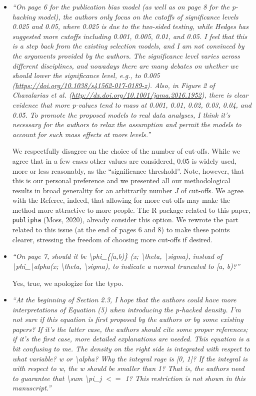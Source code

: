 \documentclass[11pt]{article}
\begin{document}
\begin{itemize}
\item \emph{``On page 6 for the publication bias model (as well as on page 8 for the p-hacking model), the authors only focus on the cutoffs of significance levels 0.025 and 0.05, where 0.025 is due to the two-sided testing, while Hedges has suggested more cutoffs including 0.001, 0.005, 0.01, and 0.05. I feel that this is a step back from the existing selection models, and I am not convinced by the arguments provided by the authors. The significance level varies across different disciplines, and nowadays there are many debates on whether we should lower the significance level, e.g., to 0.005 (\url{https://doi.org/10.1038/s41562-017-0189-z}). Also, in Figure 2 of Chavalarias et al. (\url{http://dx.doi.org/10.1001/jama.2016.1952}), there is clear evidence that more p-values tend to mass at 0.001, 0.01, 0.02, 0.03, 0.04, and 0.05. To promote the proposed models to real data analyses, I think it's necessary for the authors to relax the assumption and permit the models to account for such mass effects at more levels.''}


We respectfully disagree on the choice of the number of cut-offs. While we agree that in a few cases other values are considered, $0.05$ is widely used, more or less reasonably, as the ``significance threshold''. Note, however, that this is our personal preference and we presented all our methodological results in broad generality for an arbitrarily number $J$ of cut-offs. We agree with the Referee, indeed, that allowing for more cut-offs may make the method more attractive to more people. The R package related to this paper, \texttt{publipha} (Moss, 2020), already consider this option. We rewrote the part related to this issue (at the end of pages 6 and 8) to make these points clearer, stressing the freedom of choosing more cut-offs if desired.



\item \emph{``On page 7, should it be \textbackslash phi\_\{[a,b)\} (x; \textbackslash theta, \textbackslash sigma), instead of \textbackslash phi\_\textbackslash alpha(x; \textbackslash theta, \textbackslash sigma), to indicate a normal truncated to [a, b)?''}


Yes, true, we apologize for the typo.



\item \emph{``At the beginning of Section 2.3, I hope that the authors could have more interpretations of Equation (5) when introducing the p-hacked density. I'm not sure if this equation is first proposed by the authors or by some existing papers? If it's the latter case, the authors should cite some proper references; if it's the first case, more detailed explanations are needed. This equation is a bit confusing to me. The density on the right side is integrated with respect to what variable? w or \textbackslash alpha? Why the integral rage is [0, 1]? If the integral is with respect to w, the w should be smaller than 1? That is, the authors need to guarantee that \textbackslash sum \textbackslash pi\_j $<=$ 1? This restriction is not shown in this manuscript.''}


\end{itemize}
\end{document}
